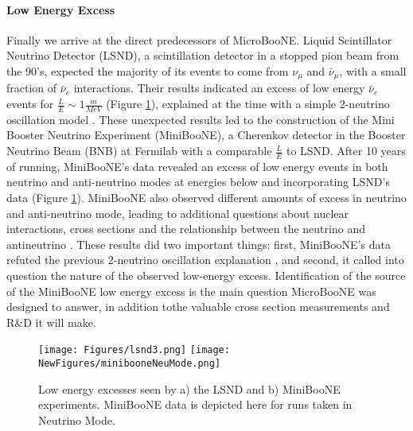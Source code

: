 \documentclass[12pt]{article}
\begin{document}
\paragraph{Low Energy Excess} %
Finally we arrive at the direct predecessors of MicroBooNE. Liquid Scintillator Neutrino Detector (LSND), a scintillation detector in a stopped pion beam from the 90's, expected the majority of its events to come from $\nu_\mu$ and $\bar{\nu}_\mu$, with a small fraction of $\bar{\nu}_e$ interactions. Their results indicated an excess of low energy $\bar{\nu}_e$ events for $\frac{L}{E} \sim 1 \frac{m}{MeV}$ (Figure \ref{fig:lsnd}), explained at the time with a simple 2-neutrino oscillation model \cite{lsnd}. These unexpected results led to the construction of the Mini Booster Neutrino Experiment (MiniBooNE), a Cherenkov detector in the Booster Neutrino Beam (BNB) at Fermilab with a comparable $\frac{L}{E}$ to LSND. After 10 years of running, MiniBooNE's data revealed an excess of low energy events in both neutrino and anti-neutrino modes at energies below and incorporating LSND's data (Figure \ref{fig:lsnd}).  MiniBooNE also observed different amounts of excess in neutrino and anti-neutrino mode, leading to additional questions about nuclear interactions, cross sections and the relationship between the neutrino and antineutrino \cite{miniboone}.  These results did two important things: first, MiniBooNE's data refuted the previous 2-neutrino oscillation explanation \cite{miniboone}, and second, it called into question the nature of the observed low-energy excess. Identification of the source of the MiniBooNE low energy excess is the main question MicroBooNE was designed to answer, in addition tothe valuable cross section measurements and R\&D it will make. 
\begin{figure}[h!]
\centering
\texttt{[image: Figures/lsnd3.png]}
\hspace{1.5 mm}
\texttt{[image: NewFigures/minibooneNeuMode.png]}
\caption{Low energy excesses seen by a) the LSND and b) MiniBooNE experiments.  MiniBooNE data is depicted here for runs taken in Neutrino Mode.}
\label{fig:lsnd}
\end{figure}
\end{document}
